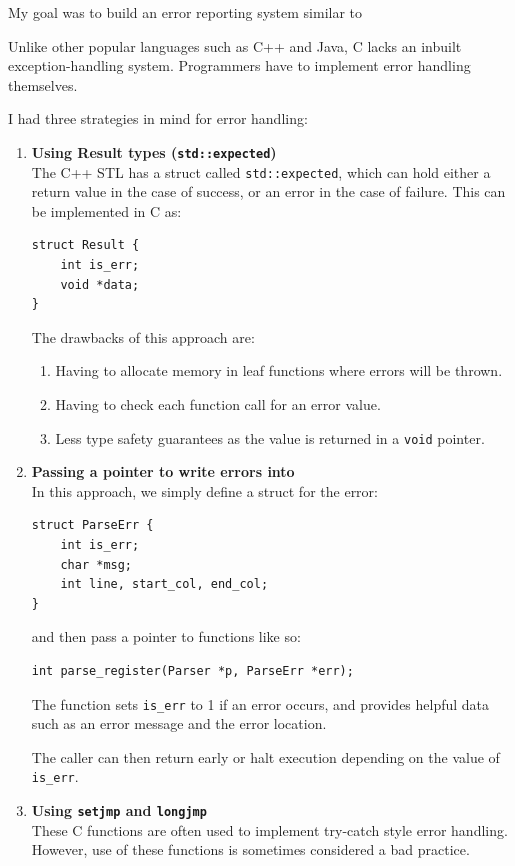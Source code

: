\documentclass{article}
\begin{document}
My goal was to build an error reporting system similar to   

Unlike other popular languages such as C++ and Java, C lacks an inbuilt exception-handling
system. Programmers have to implement error handling themselves.

I had three strategies in mind for error handling:

\begin{enumerate}
    \item \textbf{Using Result types (\texttt{std::expected})} \\
        The C++ STL has a struct called \texttt{std::expected}, which can
        hold either a return value in the case of success, or an error in
        the case of failure. This can be implemented in C as:
        \begin{verbatim}
struct Result {
    int is_err;
    void *data;
}\end{verbatim}
        The drawbacks of this approach are:
        \begin{enumerate}
            \item Having to allocate memory in leaf functions where
                errors will be thrown.
            \item Having to check each function call for an error value.
            \item Less type safety guarantees as the value is returned
                in a \texttt{void} pointer.
        \end{enumerate}

    \item \textbf{Passing a pointer to write errors into} \\
        In this approach, we simply define a struct for the error:
        \begin{verbatim}
struct ParseErr {
    int is_err;
    char *msg;
    int line, start_col, end_col;
}\end{verbatim}
        and then pass a pointer to functions like so:
        \begin{verbatim}
int parse_register(Parser *p, ParseErr *err);\end{verbatim}
        The function sets \texttt{is\_err} to 1 if an error
        occurs, and provides helpful data such as an error
        message and the error location.

        The caller can then return early or halt execution
        depending on the value of \texttt{is\_err}.
    \item \textbf{Using \texttt{setjmp} and \texttt{longjmp}} \\
        These C functions are often used to implement try-catch style error
        handling. However, use of these functions is sometimes considered
        a bad practice.
\end{enumerate}
\end{document}
